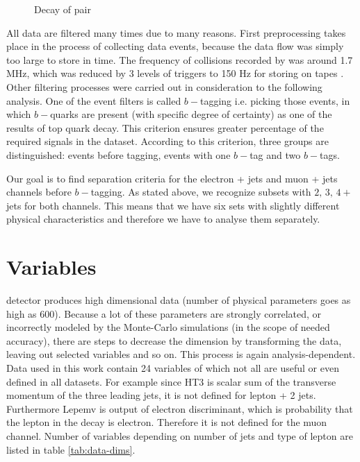 \begin{figure}[thb]
  \centering
  \caption{Decay of \ttbar pair}
\end{figure} 

All data are filtered many times due to many reasons. First preprocessing takes  place in the process of collecting data events, because the data flow was simply too large to store in time. The frequency of collisions recorded by \dzero was around 1.7 MHz, which was reduced by 3 levels of triggers to 150 Hz for storing on tapes \cite{Yuntse}. Other filtering processes were carried out in consideration to the following analysis. One of the event filters is called $b-$tagging i.e. picking those events, in which $b-$quarks are present (with specific degree of certainty) as one of the results of top quark decay. This criterion ensures greater percentage of the required signals in the dataset. According to this criterion, three groups are distinguished: events before tagging, events with one $b-$tag and two $b-$tags.

Our goal is to find separation criteria for the electron + jets and muon + jets channels before $b-$tagging. As stated above, we recognize subsets with $2, \,3,\, 4+$ jets for both channels. This means that we have six sets with slightly different physical characteristics and therefore we have to analyse them separately. 

\section{Variables}\label{sec:Variables}

\dzero detector  produces high dimensional data (number of physical parameters  goes as high as $600$). Because a lot of these parameters are strongly correlated, or incorrectly modeled by the Monte-Carlo simulations (in the scope of needed accuracy), there are steps to decrease the dimension by transforming the data, leaving out selected variables and so on. This process is again analysis-dependent. Data used in this work contain 24 variables of which not all are useful or even defined in all datasets. For example since \textsf{HT3} is scalar sum of the transverse momentum of the three leading jets, it is not defined for lepton + 2 jets. Furthermore \textsf{Lepemv} is output of electron discriminant, which is probability that the lepton in the decay is electron. Therefore it is not defined for the muon channel. Number of variables depending on number of jets and type of lepton are listed in table \ref{tab:data-dims}.

